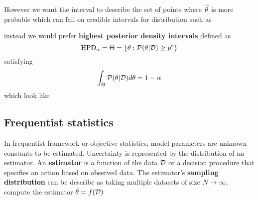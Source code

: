 \documentclass[../main.tex]{subfiles}
\begin{document}
However we want the interval to describe the set of points where $\vec{\theta}$ is more probable which can fail on credible intervals for distribution such as
\begin{figure}[H]
    \centering
\end{figure}
instead we would prefer \textbf{highest posterior density intervals} defined as
\begin{equation*}
    \mathrm{HPD}_\alpha=\Theta= \{ \theta: \mathcal{P}(\theta|\mathcal{D})\ge p^* \}
\end{equation*}
satisfying
\begin{equation*}
    \int_\Theta\mathcal{P}(\theta|\mathcal{D})d\theta=1-\alpha
\end{equation*}
which look like 
\begin{figure}[H]
    \centering
\end{figure}

\subsection{Frequentist statistics}
In frequentist framework or objective statistics, model parameters are unknown constants to be estimated. Uncertainty is represented by the distribution of an estimator. An \textbf{estimator} is a function of the data $\mathcal{D}$ or a decision procedure that specifies an action based on observed data. The estimator's \textbf{sampling distribution} can be describe as taking multiple datasets of size $N\rightarrow\infty$, compute the estimator $\hat{\theta}=f(\mathcal{D})$
\end{document}

